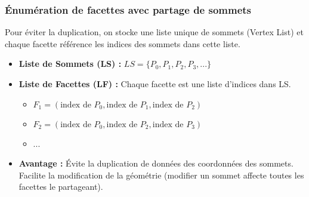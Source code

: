 \documentclass{article}
\begin{document}
\subsubsection{Énumération de facettes avec partage de sommets}

Pour éviter la duplication, on stocke une liste unique de sommets (Vertex List) et chaque facette référence les indices des sommets dans cette liste.

\begin{itemize}
    \item \textbf{Liste de Sommets (LS) :} $LS = \{P_0, P_1, P_2, P_3, ...\}$
    \item \textbf{Liste de Facettes (LF) :} Chaque facette est une liste d'indices dans LS.
        \begin{itemize}
            \item $F_1 = (\text{index de } P_0, \text{index de } P_1, \text{index de } P_2)$
            \item $F_2 = (\text{index de } P_0, \text{index de } P_2, \text{index de } P_3)$
            \item ...
        \end{itemize}
    \item \textbf{Avantage :} Évite la duplication de données des coordonnées des sommets. Facilite la modification de la géométrie (modifier un sommet affecte toutes les facettes le partageant).
\end{itemize}
\end{document}
